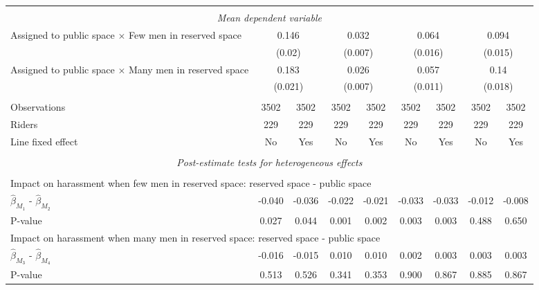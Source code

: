 \begin{tabular}{l*{8}{c}}
\\[-1.8ex] \hline \\[-1.8ex] \multicolumn{9}{c}{\textit{Mean dependent variable}} \\ Assigned to public space $\times$ Few men in reserved space& \multicolumn{2}{c}{0.146} & \multicolumn{2}{c}{0.032} & \multicolumn{2}{c}{0.064} & \multicolumn{2}{c}{0.094} \\  & \multicolumn{2}{c}{(0.02)} & \multicolumn{2}{c}{(0.007)} & \multicolumn{2}{c}{(0.016)} & \multicolumn{2}{c}{(0.015)} \\ Assigned to public space $\times$ Many men in reserved space & \multicolumn{2}{c}{0.183} & \multicolumn{2}{c}{0.026} & \multicolumn{2}{c}{0.057} & \multicolumn{2}{c}{0.14} \\  & \multicolumn{2}{c}{(0.021)} & \multicolumn{2}{c}{(0.007)} & \multicolumn{2}{c}{(0.011)} & \multicolumn{2}{c}{(0.018)} \\\\[-1ex] 
Observations        &        3502         &        3502         &        3502         &        3502         &        3502         &        3502         &        3502         &        3502         \\
Riders              &         229         &         229         &         229         &         229         &         229         &         229         &         229         &         229         \\
Line fixed effect   &          No         &         Yes         &          No         &         Yes         &          No         &         Yes         &          No         &         Yes         \\
\hline \\[-1ex]  \multicolumn{9}{c}{\textit{Post-estimate tests for heterogeneous effects}} \\\\[-1ex] \multicolumn{9}{l}{Impact on harassment when few men in reserved space: reserved space - public space} \\ \quad $\hat\beta_{M_1}$ - $\hat\beta_{M_2}$&      -0.040         &      -0.036         &      -0.022         &      -0.021         &      -0.033         &      -0.033         &      -0.012         &      -0.008         \\
\quad P-value       &       0.027         &       0.044         &       0.001         &       0.002         &       0.003         &       0.003         &       0.488         &       0.650         \\
\multicolumn{9}{l}{Impact on harassment when many men in reserved space: reserved space - public space} \\\quad $\hat\beta_{M_3}$ - $\hat\beta_{M_4}$&      -0.016         &      -0.015         &       0.010         &       0.010         &       0.002         &       0.003         &       0.003         &       0.003         \\
\quad P-value       &       0.513         &       0.526         &       0.341         &       0.353         &       0.900         &       0.867         &       0.885         &       0.867         \\
\hline\hline \end{tabular}
